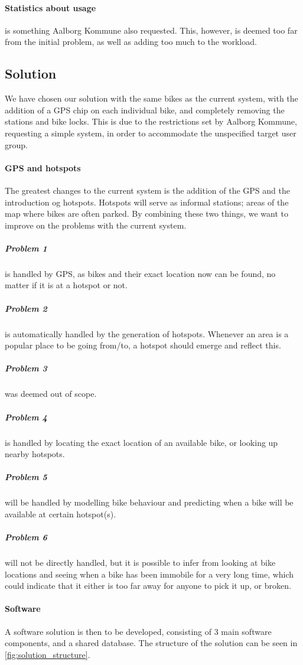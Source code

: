 \paragraph{Statistics about usage} is something Aalborg Kommune also requested.
This, however, is deemed too far from the initial problem, as well as adding too much to the workload.

\subsection{Solution}
We have chosen our solution with the same bikes as the current system, with the addition of a GPS chip on each individual bike, and completely removing the stations and bike locks.
This is due to the restrictions set by Aalborg Kommune, requesting a simple system, in order to accommodate the unspecified target user group.

\paragraph{GPS and hotspots}
The greatest changes to the current system is the addition of the GPS and the introduction og hotspots.
Hotspots will serve as informal stations; areas of the map where bikes are often parked.
By combining these two things, we want to improve on the problems with the current system.

\subparagraph{Problem 1} is handled by GPS, as bikes and their exact location now can be found, no matter if it is at a hotspot or not.

\subparagraph{Problem 2} is automatically handled by the generation of hotspots.
Whenever an area is a popular place to be going from/to, a hotspot should emerge and reflect this.

\subparagraph{Problem 3} was deemed out of scope.

\subparagraph{Problem 4} is handled by locating the exact location of an available bike, or looking up nearby hotspots.

\subparagraph{Problem 5} will be handled by modelling bike behaviour and predicting when a bike will be available at certain hotspot(s).

\subparagraph{Problem 6} will not be directly handled, but it is possible to infer from looking at bike locations and seeing when a bike has been immobile for a very long time, which could indicate that it either is too far away for anyone to pick it up, or broken.

\paragraph{Software}
A software solution is then to be developed, consisting of 3 main software components, and a shared database.
The structure of the solution can be seen in \cref{fig:solution_structure}.

